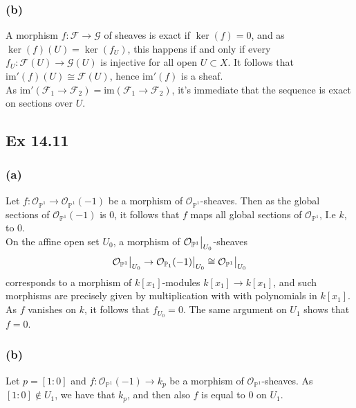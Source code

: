 \documentclass{article}
\newcommand\restr[2]{{%
  \left.\kern-\nulldelimiterspace %
  #1 %
  \vphantom{\big|} %
  \right|_{#2} %
  }}
\theoremstyle{definition}
\renewcommand{\P}{\mathbb{P}}
\newcommand{\im}{\text{im}}
\newcommand{\oo}{\mathcal{O}}
\begin{document}
\subsubsection*{(b)}

A morphism $f : \mathcal{F} \to \mathcal{G}$ of sheaves is exact if $\ker(f) =
0$, and as $\ker(f)(U) = \ker(f_U)$, this happens if and only if every $f_U :
\mathcal{F}(U) \to \mathcal{G}(U)$ is injective for all open $U \subset X$. It
follows that $\im'(f)(U) \cong \mathcal{F}(U)$, hence $\im'(f)$ is a sheaf. \\

As $\im'(\mathcal{F}_1 \to \mathcal{F}_2) = \im(\mathcal{F}_1 \to
\mathcal{F}_2)$, it's immediate that the sequence is exact on sections over
$U$.

\subsection*{Ex 14.11}

\subsubsection*{(a)}

Let $f : \oo_{\P^{1}} \to \oo_{\P^{1}}(-1)$ be a morphism of
$\oo_{\P^{1}}$-sheaves. Then as the global sections of $\oo_{\P^{1}}(-1)$ is
$0$, it follows that $f$ maps all global sections of $\oo_{\P^{1}}$, I.e $k$,
to $0$. \\

On the affine open set $U_0$, a morphism of $\restr{\oo_{\P^{1}}}{U_0}$-sheaves 
\[
	\restr{\oo_{\P^{1}}}{U_0} 
	\to \restr{\oo_{\P_1}(-1)}{U_0}
	\cong
	\restr{\oo_{\P^{1}}}{U_0}
\]
corresponds to a morphism of $k[x_1]$-modules $k[x_1] \to k[x_1]$, and such
morphisms are precisely given by multiplication with with polynomials in
$k[x_1]$. As $f$ vanishes on $k$, it follows that $f_{U_0} = 0$. The same
argument on $U_1$ shows that $f = 0$.

\subsubsection*{(b)}

Let $p = [1 : 0]$ and $f : \oo_{\P^{1}}(-1) \to k_{p}$ be a morphism of
$\oo_{\P^{1}}$-sheaves. As $[1 : 0] \not \in U_1$, we have that $k_p$, and then
also $f$ is equal to $0$ on $U_1$. \\
\end{document}
